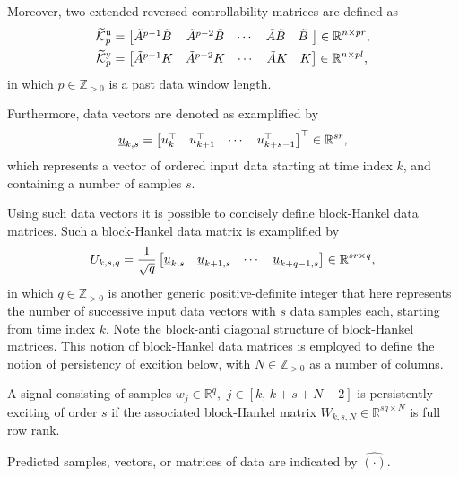 Moreover, two extended reversed controllability matrices are defined as 
\begin{align*}
\tKp{u} &= \begin{bmatrix} \tilde{A}^{p-1}\tilde{B}\, & \tilde{A}^{p-2}\tilde{B} & \cdots & \tilde{A}\tilde{B} & \tilde{B}\,\,\end{bmatrix}\in\mathbb{R}^{n\times pr},\\%
\tKp{y} &= \begin{bmatrix} \tilde{A}^{p-1}K & \tilde{A}^{p-2}K & \cdots & \tilde{A}K & K \end{bmatrix}\in\mathbb{R}^{n\times pl},
\end{align*}
in which $p\in\mathbb{Z}_{>0}$ is a past data window length.

Furthermore, data vectors are denoted as examplified by
\begin{align*}
    \underline{u}_{k,s} = \begin{bmatrix} u_k^\top & u_{k+1}^\top & \cdots & u_{k+s-1}^\top\end{bmatrix}^\top\in\mathbb{R}^{sr},
\end{align*}
which represents a vector of ordered input data starting at time index $k$, and containing a number of samples $s$.

Using such data vectors it is possible to concisely define block-Hankel data matrices. Such a block-Hankel data matrix is examplified by
\begin{align*}
    U_{k,s,q} = \frac{1}{\sqrt{q}}\begin{bmatrix}
        \underline{u}_{k,s} & \underline{u}_{k+1,s} & \cdots & \underline{u}_{k+q-1,s}
    \end{bmatrix}\in\mathbb{R}^{sr\times q},
\end{align*}
in which $q\in\mathbb{Z}_{>0}$ is another generic positive-definite integer that here represents the number of successive input data vectors with $s$ data samples each, starting from time index $k$. Note the block-anti diagonal structure of block-Hankel matrices. This notion of block-Hankel data matrices is employed to define the notion of persistency of excition below, with $N\in\mathbb{Z}_{>0}$ as a number of columns.
\begin{defn}\label{def:PE}
    A signal consisting of samples ${w_j\in\mathbb{R}^q},$ $j\in[k,\,k+s+N-2]$ is persistently exciting of order $s$ if the associated block-Hankel matrix ${W_{k,s,N}\in\mathbb{R}^{sq \times N}}$ is full row rank.
\end{defn}
Predicted samples, vectors, or matrices of data are indicated by $\hat{(\cdot)}$. %

